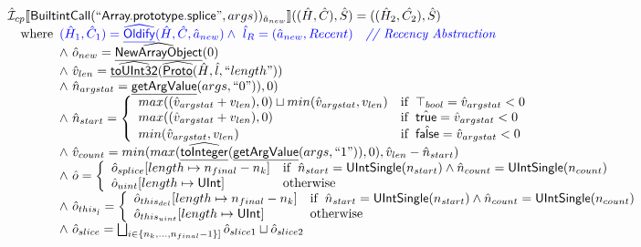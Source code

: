 \documentclass{article}
\newcommand{\SF}[1]{\mbox{\textsf{#1}}}
\newcommand{\comment}[1]{\textit{#1}}
\newcommand{\wherec}[1]{{\rm where}\begin{array}[t]{l}#1\end{array}}
\newcommand{\ifc}[1]{{\rm if}\begin{array}[t]{l}#1\end{array}}
\newcommand{\owc}{{\rm otherwise}}
\newcommand{\aI}{\hat{\mathcal{I}}}
\newcommand{\lbr}{\llbracket}
\newcommand{\rbr}{\rrbracket}
\newcommand{\hf}[1]{\underline{\sf #1}}
\newcommand{\ahf}[1]{\widehat{\underline{\sf #1}}}
\newcommand{\atrue}{\hat{\SF{true}}}
\newcommand{\afalse}{\hat{\SF{false}}}
\def\inblue{\color{blue}}
\def\inblue{\color{blue}}
\begin{document}
\[
\begin{array}{l}

\aI _{cp}\lbr \SF{BuiltintCall}(``\SF{Array.prototype.splice}",args))_{\hat{a}_{new}}\rbr((\hat{H},\hat{C}), \hat{S})
  = ((\hat{H}_2, \hat{C_2}), \hat{S})\\
\quad\wherec{
   \inblue (\hat{H}_1, \hat{C}_1) = \ahf{Oldify}(\hat{H}, \hat{C}, \hat{a}_{new})
   \land\ \inblue\hat{l}_{R} = (\hat{a}_{new}, Recent)
     \quad\comment{{\inblue // Recency Abstraction}}\\
  \land\ \hat{o}_{new} = \ahf{NewArrayObject}(0)\\
  \land\ \hat{v}_{len} = \ahf{toUInt32}(\ahf{Proto}(\hat{H}, \hat{l}, ``length"))\\
  \land\ \hat{n}_{argstat} = \hf{getArgValue}(args, ``0")), 0)\\
  \land\ \hat{n}_{start} = \left\{\begin{array}{ll}
      max((\hat{v}_{argstat}+{v}_{len}), 0) \sqcup  min(\hat{v}_{argstat},{v}_{len}) & \ifc{ \top_{bool} = \hat{v}_{argstat} < 0}\\
      max((\hat{v}_{argstat}+{v}_{len}), 0) & \ifc{ \atrue = \hat{v}_{argstat} < 0}\\
      min(\hat{v}_{argstat},{v}_{len}) & \ifc{ \afalse = \hat{v}_{argstat} < 0}\\
    \end{array}\right.\\ 
  \land\ \hat{v}_{count} = min(max(\ahf{toInteger}(\hf{getArgValue}(args, ``1")), 0), \hat{v}_{len} -\hat{n}_{start}) \\
  \land\ \hat{o} = \left\{\begin{array}{ll}
      \hat{o}_{splice}[length \mapsto n_{final} - n_{k}] & \ifc{\hat{n}_{start} = \SF{UIntSingle}(n_{start}) \land \hat{n}_{count} = \SF{UIntSingle}(n_{count})}\\
      \hat{o}_{uint}[length \mapsto \SF{UInt}] & \owc
    \end{array}\right.\\
  \land\ \hat{o}_{this_{\hat{l}}} = \left\{\begin{array}{ll}
      \hat{o}_{this_{del}}[length \mapsto n_{final} - n_{k}] & \ifc{\hat{n}_{start} = \SF{UIntSingle}(n_{start}) \land \hat{n}_{count} = \SF{UIntSingle}(n_{count})}\\
      \hat{o}_{this_{uint}}[length \mapsto \SF{UInt}] & \owc
    \end{array}\right.\\
  \land\ \hat{o}_{slice} = \bigsqcup_{i \in \{n_{k}, ..., n_{final} -1\}]}\hat{o}_{slice1} \sqcup \hat{o}_{slice2}\\
}
\end{array}\]
\end{document}
